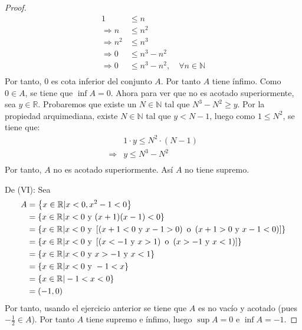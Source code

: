 \documentclass[12pt]{article}
\begin{document}
\begin{enumerate}
\begin{proof}
\begin{equation*}
\begin{split}
                1&\leq n\\
                \Rightarrow n&\leq n^2\\
                \Rightarrow n^2&\leq n^3\\
                \Rightarrow 0&\leq n^3-n^2\\
                \Rightarrow 0&\leq n^3-n^2, \quad \forall n\in\mathbb{N}\\
            \end{split}
        \end{equation*}
        Por tanto, $0$ es cota inferior del conjunto $A$. Por tanto $A$ tiene ínfimo. Como $0\in A$, se tiene que $\inf A = 0$. Ahora para ver que no es acotado superiormente, sea $y\in\mathbb{R}$. Probaremos que existe un $N\in\mathbb{N}$ tal que $N^3-N^2\geq y$.
        Por la propiedad arquimediana, existe $N\in\mathbb{N}$ tal que $y<N-1$, luego como $1\leq N^2$, se tiene que:
        \begin{equation*}
            \begin{split}
                &1\cdot y \leq N^2\cdot \left(N-1\right)\\
                \Rightarrow &y\leq N^3-N^2\\
            \end{split}
        \end{equation*}
        Por tanto, $A$ no es acotado superiormente. Así $A$ no tiene supremo.

        De (VI): Sea
        \begin{equation*}
            \begin{split}
                A &= \left\{x\in\mathbb{R}|x<0,x^2-1<0\right\}\\
                &= \left\{x\in\mathbb{R}|x<0 \textup{ y }(x+1)(x-1)<0\right\}\\
                &= \left\{x\in\mathbb{R}|x<0 \textup{ y }\left[\left(x+1 < 0 \textup{ y } x-1>0\right)\textup{ o }\left(x+1 > 0 \textup{ y } x-1<0\right)\right]\right\}\\
                &= \left\{x\in\mathbb{R}|x<0 \textup{ y }\left[\left(x<-1 \textup{ y } x>1\right)\textup{ o }\left(x>-1 \textup{ y } x<1\right)\right]\right\}\\
                &= \left\{x\in\mathbb{R}|x<0 \textup{ y }x>-1 \textup{ y } x<1\right\}\\
                &= \left\{x\in\mathbb{R}|x<0 \textup{ y }-1<x\right\}\\
                &= \left\{x\in\mathbb{R}|-1<x<0\right\}\\
                &= \left(-1,0\right)\\
            \end{split}
        \end{equation*}
        Por tanto, usando el ejercicio anterior se tiene que $A$ es no vacío y acotado (pues $-\frac{1}{2}\in A$). Por tanto $A$ tiene supremo e ínfimo, luego $\sup A = 0$ e $\inf A = -1$.


\end{proof}
\end{enumerate}
\end{document}
